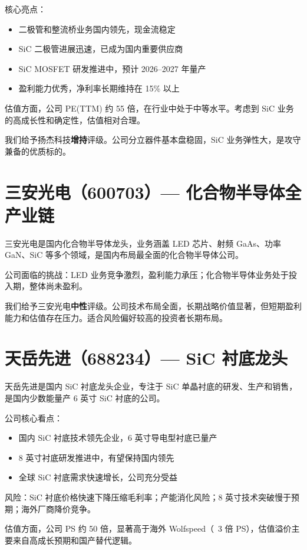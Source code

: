 核心亮点：
\begin{itemize}[leftmargin=2em]
\item 二极管和整流桥业务国内领先，现金流稳定
\item SiC 二极管进展迅速，已成为国内重要供应商
\item SiC MOSFET 研发推进中，预计 2026–2027 年量产
\item 盈利能力优秀，净利率长期维持在 15\% 以上
\end{itemize}

估值方面，公司 PE(TTM) 约 55 倍，在行业中处于中等水平。考虑到 SiC 业务的高成长性和确定性，估值相对合理。

我们给予扬杰科技\textbf{增持}评级。公司分立器件基本盘稳固，SiC 业务弹性大，是攻守兼备的优质标的。

\section{三安光电（600703）— 化合物半导体全产业链}

三安光电是国内化合物半导体龙头，业务涵盖 LED 芯片、射频 GaAs、功率 GaN、SiC 等多个领域，是国内布局最全面的化合物半导体公司。

公司面临的挑战：LED 业务竞争激烈，盈利能力承压；化合物半导体业务处于投入期，整体尚未盈利。

我们给予三安光电\textbf{中性}评级。公司技术布局全面，长期战略价值显著，但短期盈利能力和估值存在压力。适合风险偏好较高的投资者长期布局。

\section{天岳先进（688234）— SiC 衬底龙头}

天岳先进是国内 SiC 衬底龙头企业，专注于 SiC 单晶衬底的研发、生产和销售，是国内少数能量产 6 英寸 SiC 衬底的公司。

公司核心看点：
\begin{itemize}[leftmargin=2em]
\item 国内 SiC 衬底技术领先企业，6 英寸导电型衬底已量产
\item 8 英寸衬底研发推进中，有望保持国内领先
\item 全球 SiC 衬底需求快速增长，公司充分受益
\end{itemize}

风险：SiC 衬底价格快速下降压缩毛利率；产能消化风险；8 英寸技术突破慢于预期；海外厂商降价竞争。

估值方面，公司 PS 约 50 倍，显著高于海外 Wolfspeed（~3 倍 PS），估值溢价主要来自高成长预期和国产替代逻辑。

